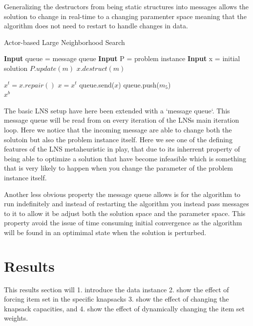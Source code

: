 \documentclass[preprint,12pt,authoryear]{elsarticle}
\begin{document}
Generalizing the destructors from being static structures into messages
allows the solution to change in real-time to a changing paramenter space meaning
that the algorithm does not need to restart to handle changes in data. 

\begin{algorithm}[H]
\caption{Actor-based Large Neighborhood Search}  \label{algo1}
\begin{algorithmic}[1]
\State \textbf{Input} queue = message queue
\State \textbf{Input} P     = problem instance
\State \textbf{Input} x     = initial solution
		\State $P.update(m)$
        \State $x.destruct(m)$
    \EndWhile
	
    \State $x^t = x.repair()$
                                 \label{alg:objective_start}
        \State $x = x^t$
		\State queue.send($x$)
    \EndIf                                           \label{alg:objective_end}
	\State queue.push($m_5$)
\EndWhile\\
\Return $x^b$
\end{algorithmic}
\end{algorithm}

The basic LNS setup have here been extended with a `message queue`. This message queue will be read from on every iteration of the LNSs main iteration loop. Here we notice that the 
incoming message are able to change both the solutoin but also the problem instance itself. Here we see one of the defining features of the LNS metaheuristic in play, that due to its inherrent 
property of being able to optimize a solution that have become infeasible which is something that is very likely to happen when you change the parameter of the problem instance itself. 

Another less obvious property the message queue allows is for the algorithm to run indefinitely and instead of restarting the algorithm you instead pass messages to it to allow it be adjust both the solution space and the parameter space.
This property avoid the issue of time consuming initial convergence as the algorithm will be found in an optimimal state when the solution is perturbed.  

\section{Results}
\label{sec:3-results}
This results section will 1. introduce the data instance 2. show the effect of forcing item set in the specific knapsacks 3. show the effect of changing the 
knapsack capacities, and 4. show the effect of dynamically changing the item set weights. 
\end{document}
